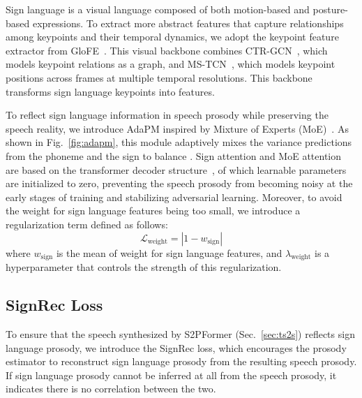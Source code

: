 Sign language is a visual language composed of both motion-based and posture-based expressions.
To extract more abstract features that capture relationships among keypoints and their temporal dynamics, we adopt the keypoint feature extractor from GloFE~\cite{lin-etal-2023-gloss}.
This visual backbone combines CTR-GCN~\cite{Chen_2021_ICCV}, which models keypoint relations as a graph, and MS-TCN~\cite{Liu_2020_CVPR}, which models keypoint positions across frames at multiple temporal resolutions. This backbone transforms sign language keypoints into features.


To reflect sign language information in speech prosody while preserving the speech reality, we introduce AdaPM inspired by Mixture of Experts (MoE)~\cite{shazeer2017outrageouslylargeneuralnetworks}. As shown in Fig.~\ref{fig:adapm}, 
this module adaptively mixes the variance predictions from the phoneme and the sign to balance .
Sign attention and MoE attention are based on the transformer decoder structure~\cite{NIPS2017_3f5ee243}, of which learnable parameters are initialized to zero, 
preventing the speech prosody from becoming noisy at the early stages of training and stabilizing adversarial learning.
Moreover, to avoid the weight for sign language features being too small, we introduce a regularization term defined as follows:
\begin{equation}
    \mathcal{L}_{\mathrm{weight}} = |1 - w_{\mathrm{sign}}|
\end{equation}
where $w_{\mathrm{sign}}$ is the mean of weight for sign language features, and $\lambda_{\mathrm{weight}}$ is a hyperparameter that controls the strength of this regularization.

\subsection{SignRec Loss}
\label{sec:prosody_rec}
To ensure that the speech synthesized by S2PFormer (Sec.~\ref{sec:ts2s}) reflects sign language prosody,
we introduce the SignRec loss, which encourages the prosody estimator to reconstruct sign language prosody from the resulting speech prosody.
If sign language prosody cannot be inferred at all from the speech prosody, 
it indicates there is no correlation between the two.

